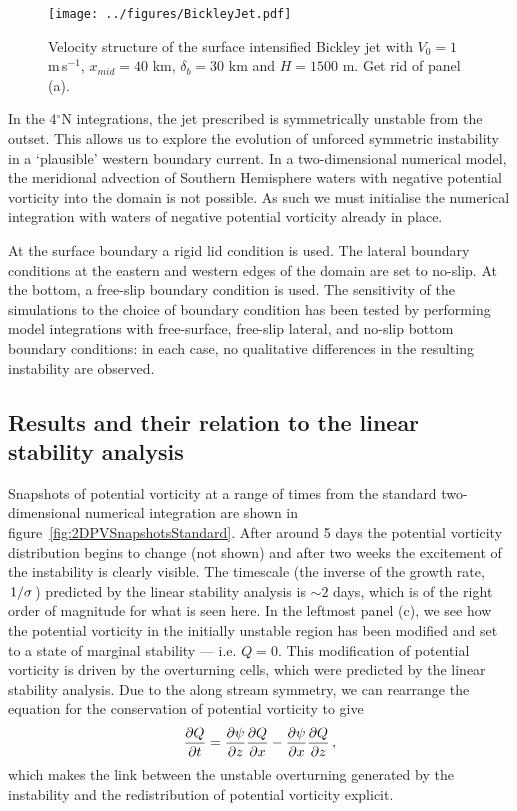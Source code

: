 \begin{figure} 
    \centering
    \texttt{[image: ../figures/BickleyJet.pdf]}
    \caption{Velocity structure of the surface intensified Bickley jet with $V_0 = 1$ m$\,$s$^{-1}$,  $x_{mid} = 40$ km, $\delta_b = 30$ km and $H = 1500$ m. Get rid of panel (a).}
    \label{fig:SurfIntBickleyJet}
\end{figure}

In the 4$^\circ$N integrations, the jet prescribed is symmetrically unstable from the outset. This allows us to explore the evolution of unforced symmetric instability in a `plausible' western boundary current. In a two-dimensional numerical model, the meridional advection of Southern Hemisphere waters with negative potential vorticity into the domain is not possible. As such we must initialise the numerical integration with waters of negative potential vorticity already in place.

At the surface boundary a rigid lid condition is used. The lateral boundary conditions at the eastern and western edges of the domain are set to no-slip. At the bottom, a free-slip boundary condition is used. The sensitivity of the simulations to the choice of boundary condition has been tested by performing model integrations with free-surface, free-slip lateral, and no-slip bottom boundary conditions: in each case, no qualitative differences in the resulting instability are observed.

\subsection{Results and their relation to the linear stability analysis}
Snapshots of potential vorticity at a range of times from the standard two-dimensional numerical integration are shown in figure~\ref{fig:2DPVSnapshotsStandard}. After around 5 days the potential vorticity distribution begins to change (not shown) and after two weeks the excitement of the instability is clearly visible. The timescale (the inverse of the growth rate, $\flatfrac{1}{\sigma}$) predicted by the linear stability analysis is $\sim 2$ days, which is of the right order of magnitude for what is seen here. In the leftmost panel (c), we see how the potential vorticity in the initially unstable region has been modified and set to a state of marginal stability --- i.e. $Q = 0$. This modification of potential vorticity is driven by the overturning cells, which were predicted by the linear stability analysis. Due to the along stream symmetry, we can rearrange the equation for the conservation of potential vorticity to give
\begin{equation}
    \label{eq:PVEvolution}
    \pdv{Q}{t} = \pdv{\psi}{z}\pdv{Q}{x} - \pdv{\psi}{x}\pdv{Q}{z} \, ,%
\end{equation}
which makes the link between the unstable overturning generated by the instability and the redistribution of potential vorticity explicit\footnotemark.

